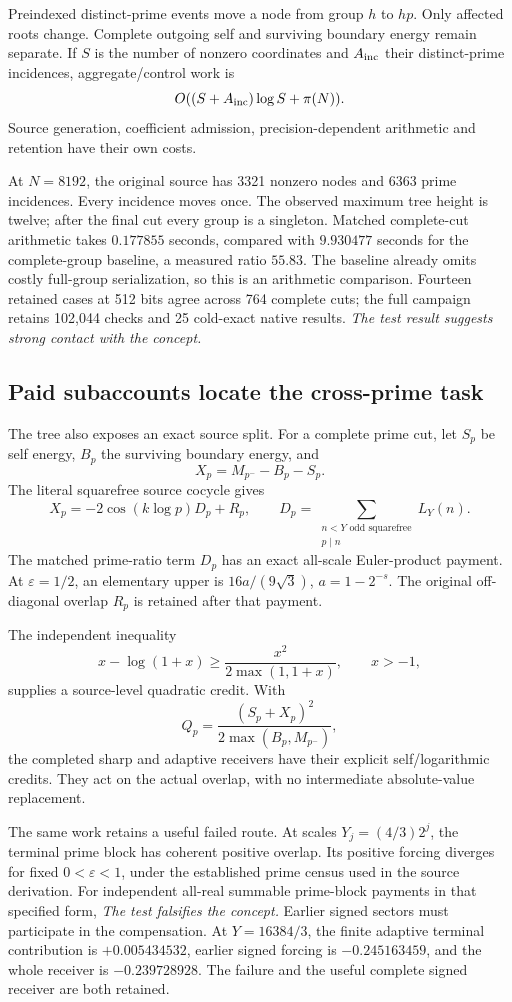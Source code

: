 Preindexed distinct-prime events move a node from group \(h\) to
\(hp\). Only affected roots change. Complete outgoing self and
surviving boundary energy remain separate. If \(S\) is the number of
nonzero coordinates and \(A_{\rm inc}\) their distinct-prime incidences,
aggregate/control work is
\[
 O((S+A_{\rm inc})\log S+\pi(N)).
\]
Source generation, coefficient admission, precision-dependent
arithmetic and retention have their own costs.

At \(N=8192\), the original source has 3321 nonzero nodes and 6363
prime incidences. Every incidence moves once. The observed maximum
tree height is twelve; after the final cut every group is a singleton.
Matched complete-cut arithmetic takes \(0.177855\) seconds, compared
with \(9.930477\) seconds for the complete-group baseline, a measured
ratio \(55.83\). The baseline already omits costly full-group
serialization, so this is an arithmetic comparison. Fourteen
retained cases at 512 bits agree across 764 complete cuts; the full
campaign retains 102,044 checks and 25 cold-exact native results.
\emph{The test result suggests strong contact with the concept.}

\subsection{Paid subaccounts locate the cross-prime task}

The tree also exposes an exact source split. For a complete prime
cut, let \(S_p\) be self energy, \(B_p\) the surviving boundary
energy, and
\[
 X_p=M_{p^-}-B_p-S_p.
\]
The literal squarefree source cocycle gives
\[
 X_p=-2\cos(k\log p)D_p+R_p,\qquad
 D_p=\sum_{\substack{n<Y\text{ odd squarefree}\\p\mid n}}L_Y(n).
\]
The matched prime-ratio term \(D_p\) has an exact all-scale Euler-product
payment. At \(\varepsilon=1/2\), an elementary upper is
\(16a/(9\sqrt3)\), \(a=1-2^{-s}\). The original off-diagonal overlap
\(R_p\) is retained after that payment.

The independent inequality
\[
 x-\log(1+x)\geq
 \frac{x^2}{2\max(1,1+x)},\qquad x>-1,
\]
supplies a source-level quadratic credit. With
\[
 Q_p=\frac{(S_p+X_p)^2}
                 {2\max(B_p,M_{p^-})},
\]
the completed sharp and adaptive receivers have their explicit
self/logarithmic credits. They act on the actual overlap, with no
intermediate absolute-value replacement.

The same work retains a useful failed route. At scales
\(Y_j=(4/3)2^j\), the terminal prime block has coherent positive
overlap. Its positive forcing diverges for fixed
\(0<\varepsilon<1\), under the established prime census used in the
source derivation. For independent all-real summable prime-block
payments in that specified form,
\emph{The test falsifies the concept.} Earlier signed sectors must
participate in the compensation. At \(Y=16384/3\), the finite
adaptive terminal contribution is \(+0.005434532\), earlier signed
forcing is \(-0.245163459\), and the whole receiver is
\(-0.239728928\). The failure and the useful complete signed receiver
are both retained.

